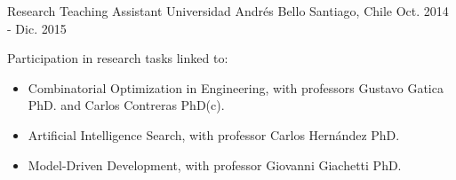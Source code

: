 \begin{cventries}
  \cventry
    {Research Teaching Assistant} %
    {Universidad Andrés Bello} %
    {Santiago, Chile} %
    {Oct. 2014 - Dic. 2015} %
    {
      \begin{cvitems} %
        \item {Participation in research tasks linked to:}
        \begin{itemize}
        	\item{Combinatorial Optimization in Engineering, with professors Gustavo Gatica PhD. and Carlos Contreras PhD(c).}
        	\item{Artificial Intelligence Search, with professor Carlos Hernández PhD.}
        	\item{Model-Driven Development, with professor Giovanni Giachetti PhD.}
      	\end{itemize}
      \end{cvitems}
    }

\end{cventries}
